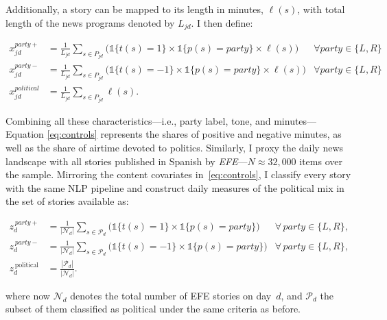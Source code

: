\documentclass[12pt]{article}
\begin{document}
	
	Additionally, a story can be mapped to its length in minutes, \( \ell(s)\), with total length of the news programs  denoted by $L_{jd}$. I then define: 
	
	
	


		\begin{equation}\label{eq:controls}
		\begin{aligned}
			x_{jd}^{party+}&= \frac{1}{L_{jd}} \sum_{s \in P_{jd}}\bigg(\mathds{1}\{t(s)=1\} \times \mathds{1}\{p(s)=party\}\times \ell(s) \bigg) &\forall party \in \{L,R\} \\
			x_{jd}^{party-}&= \frac{1}{L_{jd}} \sum_{s \in P_{jd}}\bigg( \mathds{1}\{t(s)=-1\} \times \mathds{1}\{p(s)=party\} \times \ell(s)\bigg) &\forall party \in \{L,R\} \\
			x_{jd}^{political}&=\frac{1}{L_{jd}} \sum_{s \in P_{jd}}\ell(s).
		\end{aligned}
	\end{equation} 
	

 Combining all these characteristics—i.e., party label, tone, and minutes— Equation \eqref{eq:controls} represents the  shares of positive and negative minutes, as well as the share of airtime devoted to politics.	Similarly, I proxy the daily news landscape with all stories published in Spanish by \emph{ EFE}—$N\approx32{,}000$ items over the sample. Mirroring the content covariates in~\eqref{eq:controls}, I classify every  story with the same NLP pipeline and construct daily measures of the political mix in the set of stories available as:
	
	\begin{equation}\label{eq:efe}
		\begin{aligned}
			z_d^{\,party+} &= \frac{1}{|\mathcal{N}_d|}\sum_{s\in \mathcal{P}_d}
			\bigg(\mathds{1}\{t(s)=1\}\times \mathds{1}\{p(s)=\textit{party}\}\bigg)
			&\forall\,\textit{party}\in\{L,R\},\\
			z_d^{\,party-} &= \frac{1}{|\mathcal{N}_d|}\sum_{s\in \mathcal{P}_d}
			\bigg(\mathds{1}\{t(s)=-1\}\times \mathds{1}\{p(s)=\textit{party}\}\bigg)
			&\forall\,\textit{party}\in\{L,R\},\\
			z_d^{\,\text{political}} &= \frac{|\mathcal{P}_d|}{|\mathcal{N}_d|}.
		\end{aligned}
	\end{equation}
	
	where now \(\mathcal{N}_d\) denotes the total number of  EFE stories on day~\(d\), and \(\mathcal{P}_d\) the subset of them classified as political under the same criteria as before.
	
\end{document}
